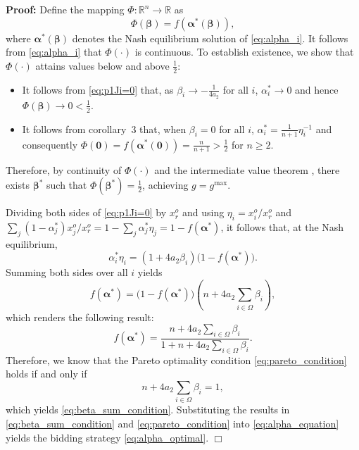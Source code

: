 \documentclass[conference]{IEEEtran}
\begin{document}
\noindent\textbf{Proof:} Define the mapping $\Phi: \mathbb{R}^n \to \mathbb{R}$ as \[ \Phi(\boldsymbol{\beta}) = f(\boldsymbol{\alpha}^*(\boldsymbol{\beta})), \] 
where $\boldsymbol{\alpha}^*(\boldsymbol{\beta})$ denotes the Nash equilibrium solution of \eqref{eq:alpha_i}. It follows from \eqref{eq:alpha_i} that $\Phi(\cdot)$ is continuous. To establish existence, we show that $\Phi(\cdot)$ attains values below and above $\frac{1}{2}$:
\begin{itemize}
\item It follows from \eqref{eq:p1Ji=0} that, as $\beta_i \to -\frac{1}{4a_2}$ for all $i$, $\alpha_i^* \to 0$ and hence $\Phi(\boldsymbol{\beta}) \to 0 < \frac{1}{2}$. 
\item It follows from corollary~3 that, when $\beta_i = 0$ for all $i$, $\alpha_i^* = \tfrac{1}{n+1}\eta_i^{-1}$ and consequently $\Phi(\boldsymbol{0}) = f(\boldsymbol{\alpha}^*(\boldsymbol{0})) = \tfrac{n}{n+1} > \frac{1}{2}$ for $n \geq 2$.
\end{itemize}
Therefore, by continuity of $\Phi(\cdot)$ and the intermediate value theorem \cite{rudin}, there exists $\boldsymbol{\beta}^*$ such that $\Phi(\boldsymbol{\beta}^*) = \frac{1}{2}$, achieving $g = g^{\max}$. 

Dividing both sides of \eqref{eq:p1Ji=0} by $x_r^o$ and using $\eta_i = x_i^o/x_r^o$ and $\sum_j(1-\alpha_j^*)x_j^o/x_r^o = 1 - \sum_j\alpha_j^*\eta_j = 1-f(\boldsymbol{\alpha}^*)$, it follows that, at the Nash equilibrium,
\begin{equation}
    \alpha_i^* \eta_i
= (1+4a_2\beta_i)\bigl(1-f(\boldsymbol{\alpha}^\ast)\bigr). \label{eq:alpha_equation}
\end{equation}
Summing both sides over all $i$ yields
\[ f(\boldsymbol{\alpha}^\ast)
= \bigl(1-f(\boldsymbol{\alpha}^\ast)\bigr)
\left(n + 4a_2\sum_{i\in\Omega} \beta_i\right),
\]
which renders the following result:
\[
f(\boldsymbol{\alpha}^\ast)
= \frac{n + 4a_2\sum_{i\in\Omega} \beta_i}{1 + n + 4a_2\sum_{i\in\Omega} \beta_i}.
\]
Therefore, we know that the Pareto optimality condition \eqref{eq:pareto_condition} holds if and
only if
\[
n + 4a_2\sum_{i\in\Omega} \beta_i = 1,
\]
which yields \eqref{eq:beta_sum_condition}. Substituting the results in \eqref{eq:beta_sum_condition} and \eqref{eq:pareto_condition} into \eqref{eq:alpha_equation} yields the bidding strategy \eqref{eq:alpha_optimal}.
\hfill $\Box$
\end{document}
